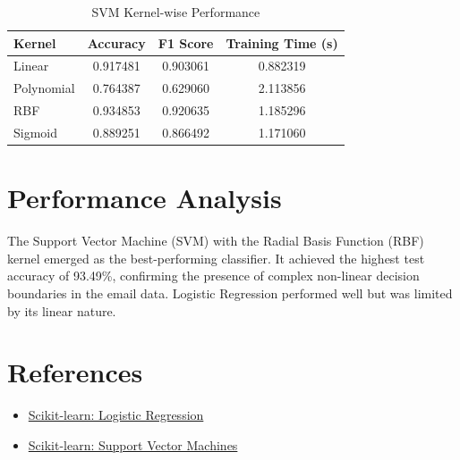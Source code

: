 \documentclass[11pt]{article}
\begin{document}
\begin{table}[H]
\centering
\caption{SVM Kernel-wise Performance}
\renewcommand{\arraystretch}{1.3}
\begin{tabular}{|l|c|c|c|}
\hline
Kernel & Accuracy & F1 Score & Training Time (s) \\ \hline
Linear &  0.917481 &  0.903061   & 0.882319 \\
Polynomial & 0.764387 & 0.629060  &  2.113856 \\
RBF & 0.934853 & 0.920635  & 1.185296 \\
Sigmoid & 0.889251 &  0.866492  & 1.171060 \\ \hline
\end{tabular}
\end{table}

\section*{Performance Analysis}
The Support Vector Machine (SVM) with the Radial Basis Function (RBF) kernel emerged as the best-performing classifier. It achieved the highest test accuracy of 93.49\%, confirming the presence of complex non-linear decision boundaries in the email data. Logistic Regression performed well but was limited by its linear nature.

\section*{References}
\begin{itemize}
    \item \href{https://scikit-learn.org/stable/modules/linear_model.html#logistic-regression}{Scikit-learn: Logistic Regression}
    \item \href{https://scikit-learn.org/stable/modules/svm.html}{Scikit-learn: Support Vector Machines}
\end{itemize}
\end{document}
